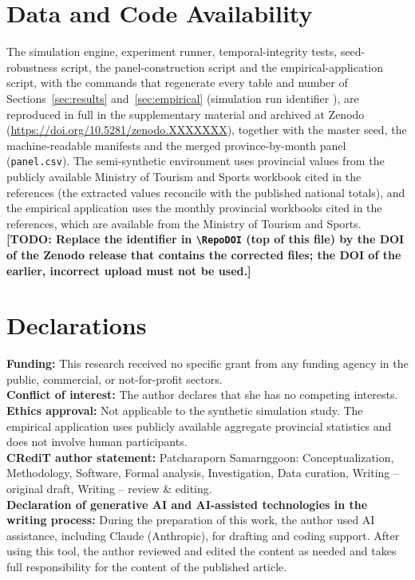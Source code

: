 \documentclass[12pt,a4paper]{article}
\newif\ifdraft \drafttrue
\newcommand{\todo}[1]{\ifdraft{\color{red}\textbf{[TODO: #1]}}\fi}
\newcommand{\RepoDOI}{10.5281/zenodo.XXXXXXX}   %
\begin{document}
\section*{Data and Code Availability}
The simulation engine, experiment runner, temporal-integrity tests, seed-robustness script, the panel-construction script and the empirical-application script, with the commands that regenerate every table and number of Sections~\ref{sec:results} and~\ref{sec:empirical} (simulation run identifier \texttt{\RunID}), are reproduced in full in the supplementary material and archived at Zenodo (\url{https://doi.org/\RepoDOI}), together with the master seed, the machine-readable manifests and the merged province-by-month panel (\texttt{panel.csv}). The semi-synthetic environment uses provincial values from the publicly available Ministry of Tourism and Sports workbook cited in the references (the extracted values reconcile with the published national totals), and the empirical application uses the monthly provincial workbooks cited in the references, which are available from the Ministry of Tourism and Sports. \todo{Replace the identifier in \texttt{\textbackslash RepoDOI} (top of this file) by the DOI of the Zenodo release that contains the corrected files; the DOI of the earlier, incorrect upload must not be used.}

\section*{Declarations}
\noindent\textbf{Funding:} This research received no specific grant from any funding agency in the public, commercial, or not-for-profit sectors.\\
\textbf{Conflict of interest:} The author declares that she has no competing interests.\\
\textbf{Ethics approval:} Not applicable to the synthetic simulation study. The empirical application uses publicly available aggregate provincial statistics and does not involve human participants.\\
\textbf{CRediT author statement:} Patcharaporn Samarnggoon: Conceptualization, Methodology, Software, Formal analysis, Investigation, Data curation, Writing -- original draft, Writing -- review \& editing.\\
\textbf{Declaration of generative AI and AI-assisted technologies in the writing process:} During the preparation of this work, the author used AI assistance, including Claude (Anthropic), for drafting and coding support. After using this tool, the author reviewed and edited the content as needed and takes full responsibility for the content of the published article.
\end{document}
